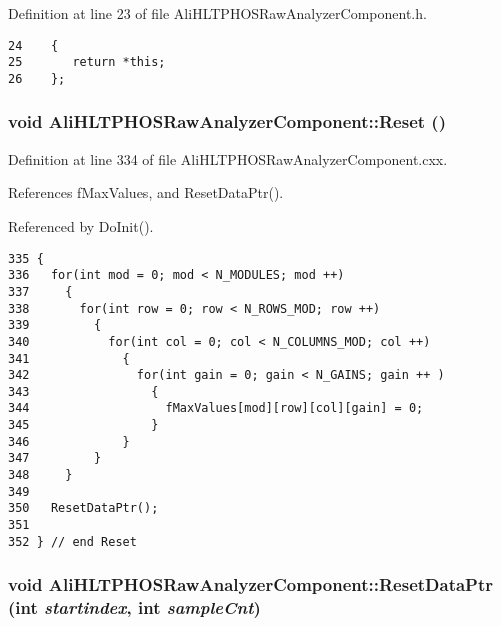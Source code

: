 Definition at line 23 of file Ali\-HLTPHOSRaw\-Analyzer\-Component.h.

\footnotesize\begin{verbatim}24    {
25       return *this;
26    };
\end{verbatim}\normalsize 


\subsubsection{\setlength{\rightskip}{0pt plus 5cm}void Ali\-HLTPHOSRaw\-Analyzer\-Component::Reset ()\hspace{0.3cm}{\tt  [private]}}\label{classAliHLTPHOSRawAnalyzerComponent_AliHLTPHOSRawAnalyzerComponentd0}




Definition at line 334 of file Ali\-HLTPHOSRaw\-Analyzer\-Component.cxx.

References f\-Max\-Values, and Reset\-Data\-Ptr().

Referenced by Do\-Init().

\footnotesize\begin{verbatim}335 {
336   for(int mod = 0; mod < N_MODULES; mod ++)
337     {
338       for(int row = 0; row < N_ROWS_MOD; row ++)
339         {
340           for(int col = 0; col < N_COLUMNS_MOD; col ++)
341             {
342               for(int gain = 0; gain < N_GAINS; gain ++ )
343                 {
344                   fMaxValues[mod][row][col][gain] = 0;
345                 }
346             }
347         }
348     }
349 
350   ResetDataPtr();
351 
352 } // end Reset
\end{verbatim}\normalsize 


\subsubsection{\setlength{\rightskip}{0pt plus 5cm}void Ali\-HLTPHOSRaw\-Analyzer\-Component::Reset\-Data\-Ptr (int {\em startindex}, int {\em sample\-Cnt})\hspace{0.3cm}{\tt  [private]}}\label{classAliHLTPHOSRawAnalyzerComponent_AliHLTPHOSRawAnalyzerComponentd3}




